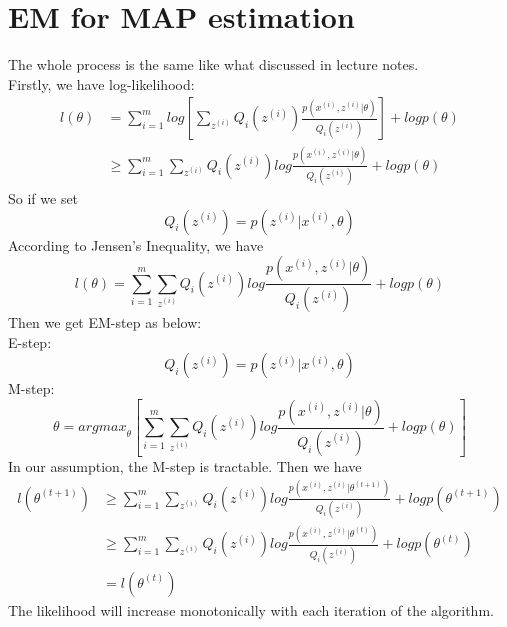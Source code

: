 \documentclass[12pt]{article}
\begin{document}
    \section*{EM for MAP estimation}
    The whole process is the same like what discussed in lecture notes. \\
    Firstly, we have log-likelihood:
    \begin{equation*}
        \begin{split}
            l(\theta) &= \sum_{i=1}^m log[\sum_{z^{(i)}}Q_i(z^{(i)})\frac{p(x^{(i)},z^{(i)}|\theta)}{Q_i(z^{(i)})}] + logp(\theta) \\
            &\geq \sum_{i=1}^m \sum_{z^{(i)}}Q_i(z^{(i)})log\frac{p(x^{(i)},z^{(i)}|\theta)}{Q_i(z^{(i)})} + logp(\theta)
        \end{split}
    \end{equation*}
    So if we set$$Q_i(z^{(i)})=p(z^{(i)}|x^{(i)},\theta)$$
    According to Jensen's Inequality, we have
    $$l(\theta)=\sum_{i=1}^m \sum_{z^{(i)}}Q_i(z^{(i)})log\frac{p(x^{(i)},z^{(i)}|\theta)}{Q_i(z^{(i)})} + logp(\theta)$$
    Then we get EM-step as below: \\
    E-step:$$Q_i(z^{(i)})=p(z^{(i)}|x^{(i)},\theta)$$
    M-step:$$\theta={argmax}_{\theta}[\sum_{i=1}^m \sum_{z^{(i)}}Q_i(z^{(i)})log\frac{p(x^{(i)},z^{(i)}|\theta)}{Q_i(z^{(i)})} + logp(\theta)]$$
    In our assumption, the M-step is tractable. Then we have
    \begin{equation*}
        \begin{split}
            l(\theta^{(t+1)}) 
            &\geq \sum_{i=1}^m \sum_{z^{(i)}}Q_i(z^{(i)})log\frac{p(x^{(i)},z^{(i)}|\theta^{(t+1)})}{Q_i(z^{(i)})} + logp(\theta^{(t+1)}) \\
            &\geq \sum_{i=1}^m \sum_{z^{(i)}}Q_i(z^{(i)})log\frac{p(x^{(i)},z^{(i)}|\theta^{(t)})}{Q_i(z^{(i)})} + logp(\theta^{(t)}) \\
            &= l(\theta^{(t)}) 
        \end{split}
    \end{equation*}
    The likelihood will increase monotonically with each iteration of the algorithm.

    \newpage
\end{document}
